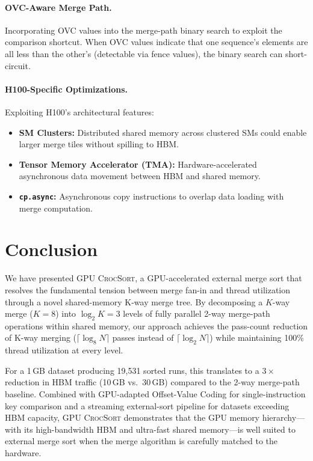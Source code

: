 \documentclass[conference,10pt]{IEEEtran}
\newcommand{\gpucrocsort}{\textsc{GPU CrocSort}\xspace}
\begin{document}
\paragraph{OVC-Aware Merge Path.}
Incorporating OVC values into the merge-path binary search to exploit
the comparison shortcut.  When OVC values indicate that one sequence's
elements are all less than the other's (detectable via fence values),
the binary search can short-circuit.

\paragraph{H100-Specific Optimizations.}
Exploiting H100's architectural features:
\begin{itemize}[leftmargin=*,topsep=2pt,itemsep=1pt]
  \item \textbf{SM Clusters:} Distributed shared memory across clustered
    SMs could enable larger merge tiles without spilling to HBM.
  \item \textbf{Tensor Memory Accelerator (TMA):} Hardware-accelerated
    asynchronous data movement between HBM and shared memory.
  \item \textbf{\texttt{cp.async}:} Asynchronous copy instructions to
    overlap data loading with merge computation.
\end{itemize}


\section{Conclusion}
\label{sec:conclusion}

We have presented \gpucrocsort, a GPU-accelerated external merge sort
that resolves the fundamental tension between merge fan-in and thread
utilization through a novel shared-memory K-way merge tree.  By
decomposing a $K$-way merge ($K{=}8$) into $\log_2 K = 3$ levels of
fully parallel 2-way merge-path operations within shared memory, our
approach achieves the pass-count reduction of K-way merging
($\lceil\log_8 N\rceil$ passes instead of $\lceil\log_2 N\rceil$)
while maintaining 100\% thread utilization at every level.

For a 1\,GB dataset producing 19{,}531 sorted runs, this translates to a
$3\times$ reduction in HBM traffic (10\,GB vs.\ 30\,GB) compared to the
2-way merge-path baseline.  Combined with GPU-adapted Offset-Value
Coding for single-instruction key comparison and a streaming external-sort
pipeline for datasets exceeding HBM capacity, \gpucrocsort demonstrates
that the GPU memory hierarchy---with its high-bandwidth HBM and
ultra-fast shared memory---is well suited to external merge sort when
the merge algorithm is carefully matched to the hardware.
\end{document}
